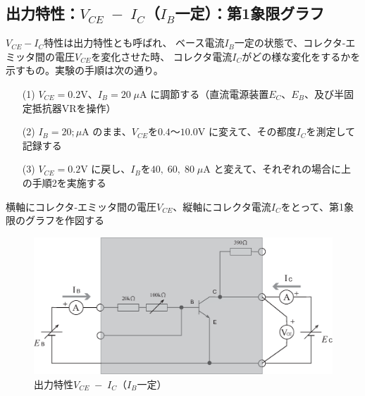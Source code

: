 \documentclass[uplatex,a4paper,11pt,oneside,openany]{jsbook}
\begin{document}
\newpage

\subsection{出力特性：$V_{CE}\;-\;I_C$（$I_B$一定）：第1象限グラフ}

$V_{CE}-I_C$特性は出力特性とも呼ばれ、
ベース電流$I_B$一定の状態で、コレクタ-エミッタ間の電圧$V_{CE}$を変化させた時、
コレクタ電流$I_C$がどの様な変化をするかを示すもの。実験の手順は次の通り。
\begin{enumerate}
\item[(1)] $V_{CE}=0.2$V、$I_B=20\;\mu$A に調節する（直流電源装置$E_C$、$E_B$、及び半固定抵抗器VRを操作）
\item[(2)] $I_B=20;\mu$A のまま、$V_{CE}$を$0.4$〜$10.0$V に変えて、その都度$I_C$を測定して記録する
\item[(3)] $V_{CE}=0.2$V に戻し、$I_B$を$40,\;60,\;80\;\mu$A と変えて、それぞれの場合に上の手順2を実施する    
\end{enumerate}
横軸にコレクタ-エミッタ間の電圧$V_{CE}$、縦軸にコレクタ電流$I_C$をとって、第1象限のグラフを作図する

\vfill

\begin{figure}[H]
  \centering
   \includegraphics[keepaspectratio, scale=0.45, angle=0]
               {figs/eps/ex1.eps}
               \caption{出力特性$V_{CE}\;-\;I_C$（$I_B$一定）}
               \label{fig:ex1}
\end{figure}

\vfill
\end{document}
